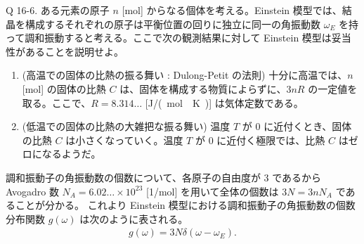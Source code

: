 \documentclass[uplatex,dvipdfmx,a4paper,11pt]{jlreq}
\theoremstyle{definition}
\begin{document}
\begin{itembox}[l]{Q 16-6.}
  ある元素の原子 $n$ [\si{mol}] からなる個体を考える。Einstein 模型では、結晶を構成するそれぞれの原子は平衡位置の回りに独立に同一の角振動数 $\omega_E$ を持って調和振動すると考える。ここで次の観測結果に対して Einstein 模型は妥当性があることを説明せよ。
  \begin{enumerate}
    \item (高温での固体の比熱の振る舞い : Dulong-Petit の法則) 十分に高温では、$n$ [\si{mol}] の固体の比熱 $C$ は、固体を構成する物質によらずに、$3nR$ の一定値を取る。ここで、$R = 8.314\ldots$ [\si{J/(mol\cdot K)}] は気体定数である。
    \item (低温での固体の比熱の大雑把な振る舞い) 温度 $T$ が $0$ に近付くとき、固体の比熱 $C$ は小さくなっていく。温度 $T$ が $0$ に近付く極限では、比熱 $C$ はゼロになるようだ。
  \end{enumerate}
\end{itembox}
調和振動子の角振動数の個数について、各原子の自由度が $3$ であるから Avogadro 数 $N_A = 6.02\ldots\times 10^{23}$ [\si{1/mol}] を用いて全体の個数は $3N = 3nN_A$ であることが分かる。
これより Einstein 模型における調和振動子の角振動数の個数分布関数 $g(\omega)$ は次のように表される。
\begin{align}
  g(\omega) = 3N\delta(\omega - \omega_E).
\end{align}
\end{document}
